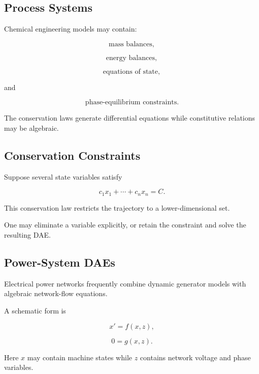 \subsection{Process Systems}
\label{subsec:process-system-daes}

Chemical engineering models may contain:

\[
\boxed{
\text{mass balances},
}
\]

\[
\boxed{
\text{energy balances},
}
\]

\[
\boxed{
\text{equations of state},
}
\]

and

\[
\boxed{
\text{phase-equilibrium constraints}.
}
\]

The conservation laws generate differential equations while constitutive
relations may be algebraic.

\subsection{Conservation Constraints}
\label{subsec:conservation-constraints-dae}

Suppose several state variables satisfy

\[
\boxed{
c_1x_1+\cdots+c_nx_n=C.
}
\]

This conservation law restricts the trajectory to a lower-dimensional
set.

One may eliminate a variable explicitly, or retain the constraint and
solve the resulting DAE.

\subsection{Power-System DAEs}
\label{subsec:power-system-daes}

Electrical power networks frequently combine dynamic generator models
with algebraic network-flow equations.

A schematic form is

\[
\boxed{
x'=f(x,z),
}
\]

\[
\boxed{
0=g(x,z).
}
\]

Here \(x\) may contain machine states while \(z\) contains network voltage
and phase variables.

